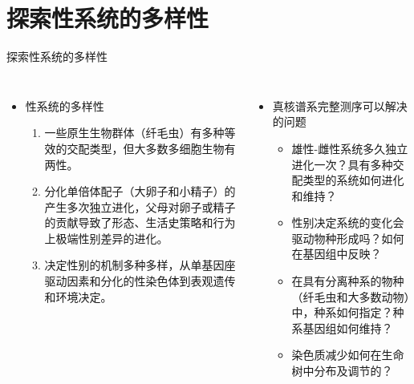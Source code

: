 \documentclass{beamer}
\begin{document}

	\section{探索性系统的多样性}
	\begin{frame}{探索性系统的多样性}
		\begin{columns}
			\begin{itemize}
				\item 性系统的多样性
				\begin{enumerate}
					\item 一些原生生物群体（纤毛虫）有多种等效的交配类型，但大多数多细胞生物有两性。
					\item 分化单倍体配子（大卵子和小精子）的产生多次独立进化，父母对卵子或精子的贡献导致了形态、生活史策略和行为上极端性别差异的进化。
					\item 决定性别的机制多种多样，从单基因座驱动因素和分化的性染色体到表观遗传和环境决定。
				\end{enumerate}
			\end{itemize}

			\begin{itemize}
				\item 真核谱系完整测序可以解决的问题
				\begin{itemize}
					\item 雄性-雌性系统多久独立进化一次？具有多种交配类型的系统如何进化和维持？
					\item 性别决定系统的变化会驱动物种形成吗？如何在基因组中反映？
					\item 在具有分离种系的物种（纤毛虫和大多数动物）中，种系如何指定？种系基因组如何维持？
					\item 染色质减少如何在生命树中分布及调节的？
					
				\end{itemize}
			\end{itemize}
		\end{columns}
	\end{frame}

\end{document}
